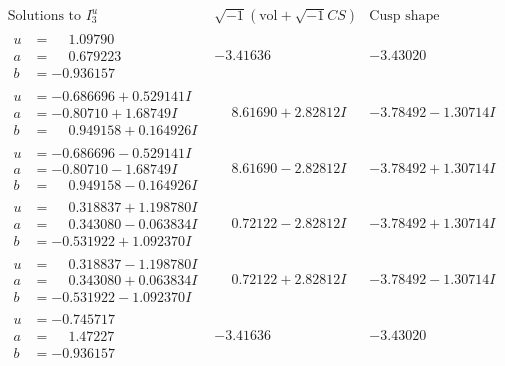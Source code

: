 \documentclass[1p]{elsarticle_modified}
\theoremstyle{definition}
\newcommand{\I}{\sqrt{-1}}
\begin{document}
$$\begin{array}{c|c|c}  
\text{Solutions to }I^u_{3}& \I (\text{vol} + \sqrt{-1}CS) & \text{Cusp shape}\\
 \hline 
\begin{aligned}
u &= \phantom{-}1.09790\phantom{ +0.000000I} \\
a &= \phantom{-}0.679223\phantom{ +0.000000I} \\
b &= -0.936157\phantom{ +0.000000I}\end{aligned}
 & -3.41636\phantom{ +0.000000I} & -3.43020\phantom{ +0.000000I} \\ \hline\begin{aligned}
u &= -0.686696 + 0.529141 I \\
a &= -0.80710 + 1.68749 I \\
b &= \phantom{-}0.949158 + 0.164926 I\end{aligned}
 & \phantom{-}8.61690 + 2.82812 I & -3.78492 - 1.30714 I \\ \hline\begin{aligned}
u &= -0.686696 - 0.529141 I \\
a &= -0.80710 - 1.68749 I \\
b &= \phantom{-}0.949158 - 0.164926 I\end{aligned}
 & \phantom{-}8.61690 - 2.82812 I & -3.78492 + 1.30714 I \\ \hline\begin{aligned}
u &= \phantom{-}0.318837 + 1.198780 I \\
a &= \phantom{-}0.343080 - 0.063834 I \\
b &= -0.531922 + 1.092370 I\end{aligned}
 & \phantom{-}0.72122 - 2.82812 I & -3.78492 + 1.30714 I \\ \hline\begin{aligned}
u &= \phantom{-}0.318837 - 1.198780 I \\
a &= \phantom{-}0.343080 + 0.063834 I \\
b &= -0.531922 - 1.092370 I\end{aligned}
 & \phantom{-}0.72122 + 2.82812 I & -3.78492 - 1.30714 I \\ \hline\begin{aligned}
u &= -0.745717\phantom{ +0.000000I} \\
a &= \phantom{-}1.47227\phantom{ +0.000000I} \\
b &= -0.936157\phantom{ +0.000000I}\end{aligned}
 & -3.41636\phantom{ +0.000000I} & -3.43020\phantom{ +0.000000I} \\ \hline\begin{aligned}

\end{aligned}
\end{array}$$
\end{document}
